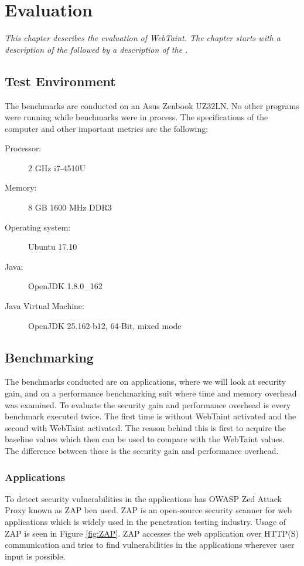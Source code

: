 \chapter{Evaluation}
\label{Evaluation}
\textit{This chapter describes the evaluation of WebTaint. The chapter starts with a description of the \textit{} followed by a description of the \textit{}.}



\section{Test Environment}
\label{TestEnvironment}
The benchmarks are conducted on an Asus Zenbook UZ32LN. No other programs were running while benchmarks were in process. The specifications of the computer and other important metrics are the following:

\begin{description}
    \item [Processor:] 2 GHz i7-4510U
    \item [Memory:] 8 GB 1600 MHz DDR3
    \item [Operating system:] Ubuntu 17.10
    \item [Java:] OpenJDK 1.8.0\_162
    \item [Java Virtual Machine:] OpenJDK 25.162-b12, 64-Bit, mixed mode
\end{description}



\section{Benchmarking}
\label{Benchmarking}
The benchmarks conducted are on applications, where we will look at security gain, and on a performance benchmarking suit where time and memory overhead was examined. To evaluate the security gain and performance overhead is every benchmark executed twice. The first time is without WebTaint activated and the second with WebTaint activated. The reason behind this is first to acquire the baseline values which then can be used to compare with the WebTaint values. The difference between these is the security gain and performance overhead.



\subsection{Applications}
To detect security vulnerabilities in the applications has OWASP Zed Attack Proxy \parencite{zap} known as ZAP ben used. ZAP is an open-source security scanner for web applications which is widely used in the penetration testing industry. Usage of ZAP is seen in Figure \ref{fig:ZAP}. ZAP accesses the web application over HTTP(S) communication and tries to find vulnerabilities in the applications wherever user input is possible.

